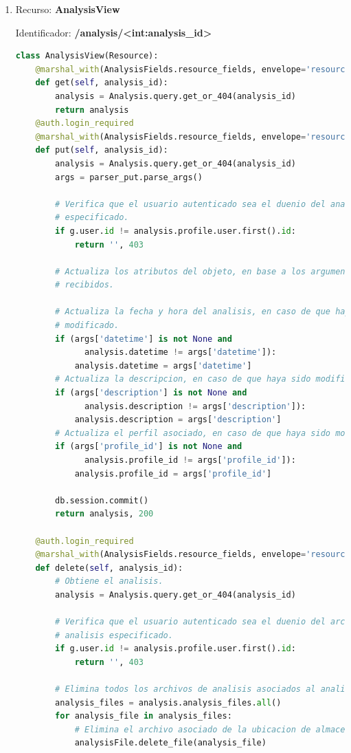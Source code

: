 \documentclass[a4paper,12pt]{article}
\begin{document}
\begin{enumerate}
\item Recurso: \textbf{AnalysisView} 
	
Identificador: \textbf{/analysis/<int:analysis\_id>}
\begin{lstlisting}[language=Python]
class AnalysisView(Resource):
    @marshal_with(AnalysisFields.resource_fields, envelope='resource')
    def get(self, analysis_id):
        analysis = Analysis.query.get_or_404(analysis_id)
        return analysis
    @auth.login_required
    @marshal_with(AnalysisFields.resource_fields, envelope='resource')
    def put(self, analysis_id):
        analysis = Analysis.query.get_or_404(analysis_id)
        args = parser_put.parse_args()

        # Verifica que el usuario autenticado sea el duenio del analisis
        # especificado.
        if g.user.id != analysis.profile.user.first().id:
            return '', 403

        # Actualiza los atributos del objeto, en base a los argumentos
        # recibidos.

        # Actualiza la fecha y hora del analisis, en caso de que haya sido
        # modificado.
        if (args['datetime'] is not None and
              analysis.datetime != args['datetime']):
            analysis.datetime = args['datetime']
        # Actualiza la descripcion, en caso de que haya sido modificada.
        if (args['description'] is not None and
              analysis.description != args['description']):
            analysis.description = args['description']
        # Actualiza el perfil asociado, en caso de que haya sido modificado.
        if (args['profile_id'] is not None and
              analysis.profile_id != args['profile_id']):
            analysis.profile_id = args['profile_id']

        db.session.commit()
        return analysis, 200

    @auth.login_required
    @marshal_with(AnalysisFields.resource_fields, envelope='resource')
    def delete(self, analysis_id):
        # Obtiene el analisis.
        analysis = Analysis.query.get_or_404(analysis_id)

        # Verifica que el usuario autenticado sea el duenio del archivo de
        # analisis especificado.
        if g.user.id != analysis.profile.user.first().id:
            return '', 403

        # Elimina todos los archivos de analisis asociados al analisis.
        analysis_files = analysis.analysis_files.all()
        for analysis_file in analysis_files:
            # Elimina el archivo asociado de la ubicacion de almacenamiento.
            analysisFile.delete_file(analysis_file)


\end{lstlisting}
\end{enumerate}
\end{document}

